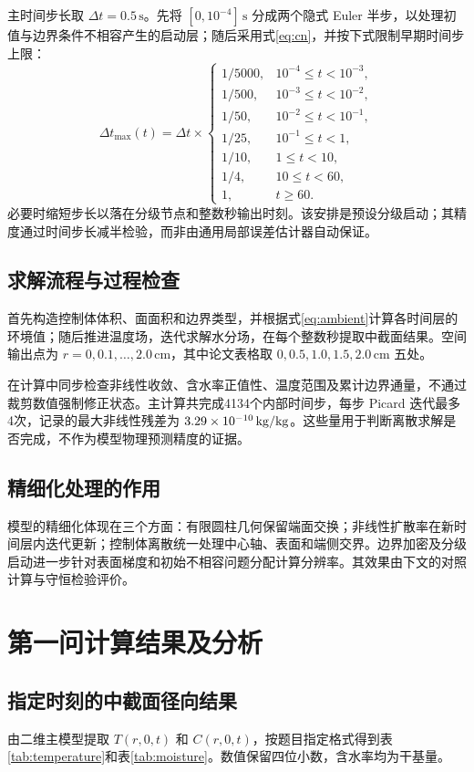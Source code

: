 主时间步长取 $\Delta t=0.5\,\mathrm{s}$。先将 $[0,10^{-4}]\,\mathrm{s}$ 分成两个隐式 Euler 半步，以处理初值与边界条件不相容产生的启动层；随后采用式\eqref{eq:cn}，并按下式限制早期时间步上限：
\begin{equation}
 \Delta t_{\max}(t)=\Delta t\times
 \begin{cases}
  1/5000,&10^{-4}\le t<10^{-3},\\
  1/500,&10^{-3}\le t<10^{-2},\\
  1/50,&10^{-2}\le t<10^{-1},\\
  1/25,&10^{-1}\le t<1,\\
  1/10,&1\le t<10,\\
  1/4,&10\le t<60,\\
  1,&t\ge60.
 \end{cases}
 \label{eq:startup}
\end{equation}
必要时缩短步长以落在分级节点和整数秒输出时刻。该安排是预设分级启动；其精度通过时间步长减半检验，而非由通用局部误差估计器自动保证。

\subsection{求解流程与过程检查}
首先构造控制体体积、面面积和边界类型，并根据式\eqref{eq:ambient}计算各时间层的环境值；随后推进温度场，迭代求解水分场，在每个整数秒提取中截面结果。空间输出点为 $r=0,0.1,\ldots,2.0\,\mathrm{cm}$，其中论文表格取 $0,0.5,1.0,1.5,2.0\,\mathrm{cm}$ 五处。

在计算中同步检查非线性收敛、含水率正值性、温度范围及累计边界通量，不通过裁剪数值强制修正状态。主计算共完成4134个内部时间步，每步 Picard 迭代最多4次，记录的最大非线性残差为 $3.29\times10^{-10}\,\mathrm{kg/kg}$。这些量用于判断离散求解是否完成，不作为模型物理预测精度的证据。

\subsection{精细化处理的作用}
模型的精细化体现在三个方面：有限圆柱几何保留端面交换；非线性扩散率在新时间层内迭代更新；控制体离散统一处理中心轴、表面和端侧交界。边界加密及分级启动进一步针对表面梯度和初始不相容问题分配计算分辨率。其效果由下文的对照计算与守恒检验评价。

\clearpage
\section{第一问计算结果及分析}

\subsection{指定时刻的中截面径向结果}
由二维主模型提取 $T(r,0,t)$ 和 $C(r,0,t)$，按题目指定格式得到表\ref{tab:temperature}和表\ref{tab:moisture}。数值保留四位小数，含水率均为干基量。



